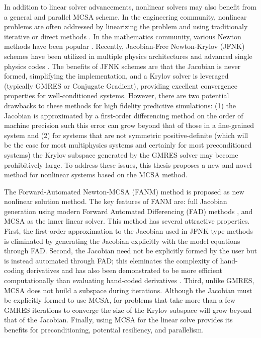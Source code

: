 \documentclass[letterpaper,12pt]{article}
\begin{document}
In addition to linear solver advancements, nonlinear solvers may also
benefit from a general and parallel MCSA scheme. In the engineering
community, nonlinear problems are often addressed by linearizing the
problem and using traditionaly iterative or direct methods
\cite{Tannehill_1997}. In the mathematics community, various Newton
methods have been popular \cite{Kelley_1995}. Recently, Jacobian-Free
Newton-Krylov (JFNK) schemes \cite{Knoll_2004} have been utilized in
multiple physics architectures and advanced single physics codes
\cite{Gaston_2009}. The benefits of JFNK schemes are that the Jacobian
is never formed, simplifying the implementation, and a Krylov solver
is leveraged (typically GMRES or Conjugate Gradient), providing
excellent convergence properties for well-conditioned
systems. However, there are two potential drawbacks to these methods
for high fidelity predictive simulations: (1) the Jacobian is
approximated by a first-order differencing method on the order of
machine precision such this error can grow beyond that of those in a
fine-grained system and (2) for systems that are not symmetric
positive-definite (which will be the case for most multiphysics
systems and certainly for most preconditioned systems) the Krylov
subspace generated by the GMRES solver may become prohibitively
large. To address these issues, this thesis proposes a new and novel
method for nonlinear systems based on the MCSA method.

The Forward-Automated Newton-MCSA (FANM) method is proposed as new
nonlinear solution method. The key features of FANM are: full Jacobian
generation using modern Forward Automated Differencing (FAD) methods
\cite{Bartlett_2006}, and MCSA as the inner linear solver. This method
has several attractive properties. First, the first-order
approximation to the Jacobian used in JFNK type methods is eliminated
by generating the Jacobian explicitly with the model equations through
FAD. Second, the Jacobian need not be explicitly formed by the user
but is instead automated through FAD; this eleminates the complexity
of hand-coding derivatives and has also been demonstrated to be more
efficient computationally than evaluating hand-coded derivatives
\cite{Bartlett_2006}. Third, unlike GMRES, MCSA does not build a
subspace during iterations. Although the Jacobian must be explicitly
formed to use MCSA, for problems that take more than a few GMRES
iterations to converge the size of the Krylov subspace will grow
beyond that of the Jacobian. Finally, using MCSA for the linear solve
provides its benefits for preconditioning, potential resiliency, and
parallelism.
\end{document}
